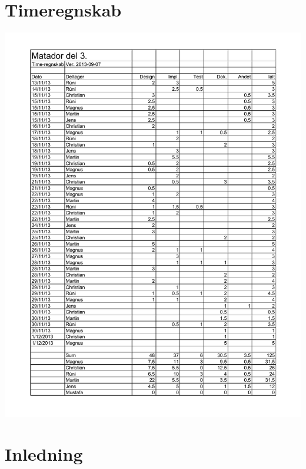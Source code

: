 \documentclass[11pt,a4paper]{article}  	%
\begin{document}
\normalfont


\tableofcontents
\newpage
\section{Timeregnskab}
\noindent \includegraphics[width=\linewidth]{51_del3_Timeregnskab}
\newpage
\section{Inledning}

\end{document}
